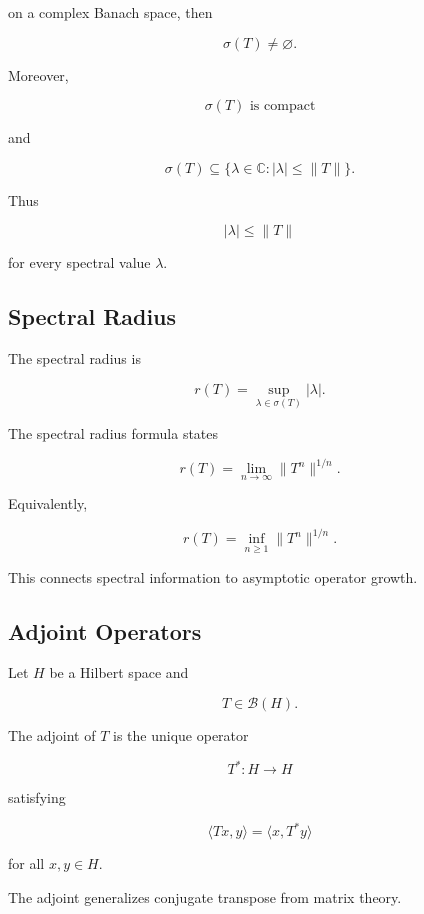 on a complex Banach space, then

\[
\boxed{
\sigma(T)\neq\varnothing.
}
\]

Moreover,

\[
\boxed{
\sigma(T)
\text{ is compact}
}
\]

and

\[
\boxed{
\sigma(T)
\subseteq
\{
\lambda\in\mathbb{C}:
|\lambda|\leq\|T\|
\}.
}
\]

Thus

\[
\boxed{
|\lambda|\leq\|T\|
}
\]

for every spectral value \(\lambda\).

\subsection{Spectral Radius}
\label{subsec:spectral-radius}

The spectral radius is

\[
\boxed{
r(T)
=
\sup_{\lambda\in\sigma(T)}
|\lambda|.
}
\]

The spectral radius formula states

\[
\boxed{
r(T)
=
\lim_{n\to\infty}
\|T^n\|^{1/n}.
}
\]

Equivalently,

\[
\boxed{
r(T)
=
\inf_{n\geq1}
\|T^n\|^{1/n}.
}
\]

This connects spectral information to asymptotic operator growth.

\subsection{Adjoint Operators}
\label{subsec:adjoint-operators}

Let \(H\) be a Hilbert space and

\[
T\in\mathcal{B}(H).
\]

The adjoint of \(T\) is the unique operator

\[
\boxed{
T^*:H\to H
}
\]

satisfying

\[
\boxed{
\langle Tx,y\rangle
=
\langle x,T^*y\rangle
}
\]

for all \(x,y\in H\).

The adjoint generalizes conjugate transpose from matrix theory.


